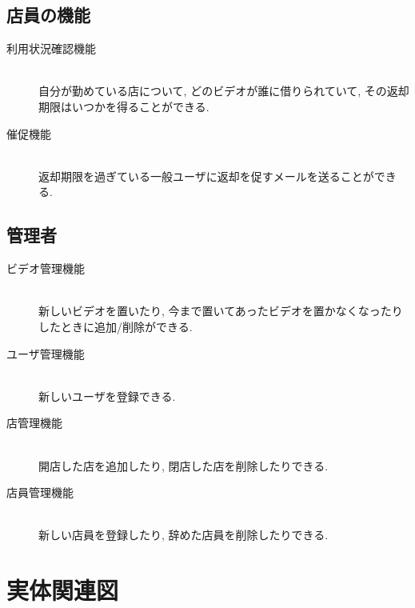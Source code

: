 \documentclass{jarticle}
\begin{document}
\subsection{店員の機能}
\begin{description}
\item[利用状況確認機能] \\ \leavevmode
自分が勤めている店について, どのビデオが誰に借りられていて, その返却期限はいつかを得ることができる.
\item[催促機能] \\ \leavevmode
返却期限を過ぎている一般ユーザに返却を促すメールを送ることができる.
\end{description}
\subsection{管理者}
\begin{description}
\item[ビデオ管理機能] \\ \leavevmode
新しいビデオを置いたり, 今まで置いてあったビデオを置かなくなったりしたときに追加/削除ができる.
\item[ユーザ管理機能] \\ \leavevmode
新しいユーザを登録できる.
\item[店管理機能] \\ \leavevmode
開店した店を追加したり, 閉店した店を削除したりできる.
\item[店員管理機能] \\ \leavevmode
新しい店員を登録したり, 辞めた店員を削除したりできる.
\end{description}
\section{実体関連図}
\end{document}
